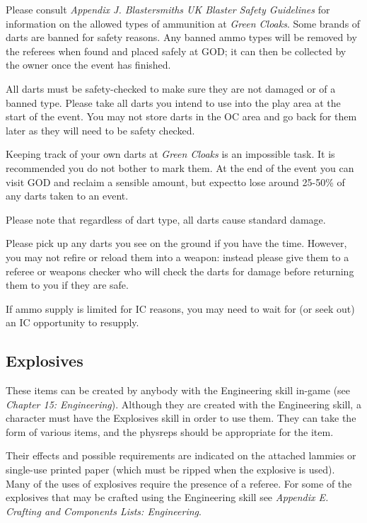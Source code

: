\documentclass{scrbook}
\begin{document}
Please consult \textit{Appendix J. Blastersmiths UK Blaster Safety Guidelines} for information on the allowed types of ammunition at \textit{Green Cloaks}. Some brands of darts are banned for safety reasons. Any banned ammo types will be removed by the referees when found and placed safely at GOD; it can then be collected by the owner once the event has finished.

All darts must be safety-checked to make sure they are not damaged or of a banned type. Please take all darts you intend to use into the play area at the start of the event. You may not store darts in the OC area and go back for them later as they will need to be safety checked.

Keeping track of your own darts at \textit{Green Cloaks} is an impossible task. It is recommended you do not bother to mark them. At the end of the event you can visit GOD and reclaim a sensible amount, but expectto lose around 25-50\% of any darts taken to an event.

Please note that regardless of dart type, all darts cause standard damage.

Please pick up any darts you see on the ground if you have the time. However, you may not refire or reload them into a weapon: instead please give them to a referee or weapons checker who will check the darts for damage before returning them to you if they are safe.

If ammo supply is limited for IC reasons, you may need to wait for (or seek out) an IC opportunity to resupply.

\subsection{Explosives}

These items can be created by anybody with the Engineering skill in-game (see \textit{Chapter 15: Engineering}). Although they are created with the Engineering skill, a character must have the Explosives skill in order to use them. They can take the form of various items, and the physreps should be appropriate for the item.

Their effects and possible requirements are indicated on the attached lammies or single-use printed paper (which must be ripped when the explosive is used). Many of the uses of explosives require the presence of a referee. For some of the explosives that may be crafted using the Engineering skill see \textit{Appendix E.} \textit{Crafting and Components Lists: Engineering}.
\end{document}
